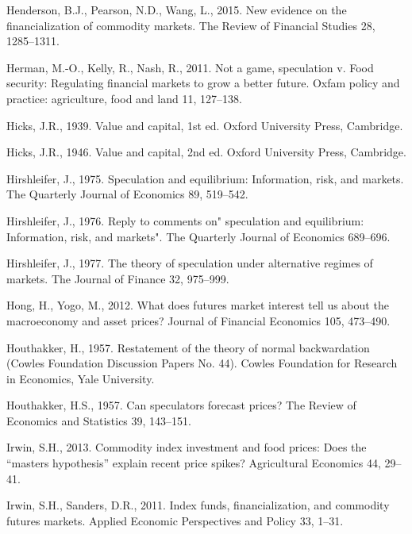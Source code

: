 \documentclass[]{elsarticle} %
\begin{document}
\leavevmode\hypertarget{ref-henderson_new_2015}{}%
Henderson, B.J., Pearson, N.D., Wang, L., 2015. New evidence on the financialization of commodity markets. The Review of Financial Studies 28, 1285--1311.

\leavevmode\hypertarget{ref-herman_not_2011}{}%
Herman, M.-O., Kelly, R., Nash, R., 2011. Not a game, speculation v. Food security: Regulating financial markets to grow a better future. Oxfam policy and practice: agriculture, food and land 11, 127--138.

\leavevmode\hypertarget{ref-hicks_value_1939}{}%
Hicks, J.R., 1939. Value and capital, 1st ed. Oxford University Press, Cambridge.

\leavevmode\hypertarget{ref-hicks_value_1946}{}%
Hicks, J.R., 1946. Value and capital, 2nd ed. Oxford University Press, Cambridge.

\leavevmode\hypertarget{ref-hirshleifer_speculation_1975}{}%
Hirshleifer, J., 1975. Speculation and equilibrium: Information, risk, and markets. The Quarterly Journal of Economics 89, 519--542.

\leavevmode\hypertarget{ref-hirshleifer_reply_1976}{}%
Hirshleifer, J., 1976. Reply to comments on" speculation and equilibrium: Information, risk, and markets". The Quarterly Journal of Economics 689--696.

\leavevmode\hypertarget{ref-hirshleifer_theory_1977}{}%
Hirshleifer, J., 1977. The theory of speculation under alternative regimes of markets. The Journal of Finance 32, 975--999.

\leavevmode\hypertarget{ref-hong_what_2012}{}%
Hong, H., Yogo, M., 2012. What does futures market interest tell us about the macroeconomy and asset prices? Journal of Financial Economics 105, 473--490.

\leavevmode\hypertarget{ref-houthakker_restatement_1957}{}%
Houthakker, H., 1957. Restatement of the theory of normal backwardation (Cowles Foundation Discussion Papers No. 44). Cowles Foundation for Research in Economics, Yale University.

\leavevmode\hypertarget{ref-houthakker_speculators_1957}{}%
Houthakker, H.S., 1957. Can speculators forecast prices? The Review of Economics and Statistics 39, 143--151.

\leavevmode\hypertarget{ref-irwin_commodity_2013}{}%
Irwin, S.H., 2013. Commodity index investment and food prices: Does the ``masters hypothesis'' explain recent price spikes? Agricultural Economics 44, 29--41.

\leavevmode\hypertarget{ref-irwin_index_2011}{}%
Irwin, S.H., Sanders, D.R., 2011. Index funds, financialization, and commodity futures markets. Applied Economic Perspectives and Policy 33, 1--31.
\end{document}
